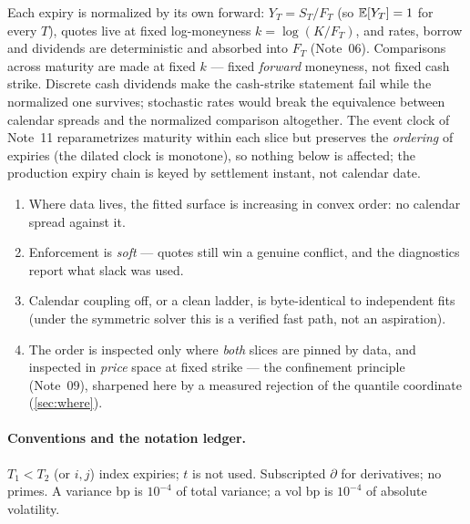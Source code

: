 \documentclass[11pt]{article}
\begin{document}
\begin{assumption}
\label{ass:units}
Each expiry is normalized by its own forward: $Y_T=S_T/F_T$ (so
$\mathbb{E}[Y_T]=1$ for every $T$), quotes live at fixed log-moneyness
$k=\log(K/F_T)$, and rates, borrow and dividends are deterministic and
absorbed into $F_T$ (Note~06).  Comparisons across maturity are made at
fixed $k$ --- fixed \emph{forward} moneyness, not fixed cash strike.
Discrete cash dividends make the cash-strike statement fail while the
normalized one survives; stochastic rates would break the equivalence
between calendar spreads and the normalized comparison altogether.  The
event clock of Note~11 reparametrizes maturity within each slice but
preserves the \emph{ordering} of expiries (the dilated clock is
monotone), so nothing below is affected; the production expiry chain is
keyed by settlement instant, not calendar date.
\end{assumption}

\begin{invariant}
\begin{enumerate}[leftmargin=1.6em]
\item Where data lives, the fitted surface is increasing in convex
order: no calendar spread against it.
\item Enforcement is \emph{soft} --- quotes still win a genuine
conflict, and the diagnostics report what slack was used.
\item Calendar coupling off, or a clean ladder, is byte-identical to
independent fits (under the symmetric solver this is a verified fast
path, not an aspiration).
\item The order is inspected only where \emph{both} slices are pinned
by data, and inspected in \emph{price} space at fixed strike --- the
confinement principle (Note~09), sharpened here by a measured rejection
of the quantile coordinate (\cref{sec:where}).
\end{enumerate}
\end{invariant}

\paragraph{Conventions and the notation ledger.}
$T_1<T_2$ (or $i,j$) index expiries; $t$ is not used.  Subscripted
$\partial$ for derivatives; no primes.  A variance bp is $10^{-4}$ of
total variance; a vol bp is $10^{-4}$ of absolute volatility.
\end{document}
